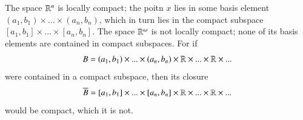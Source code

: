 \documentclass[12pt, a4paper, oneside, openright, titlepage]{book}
\begin{document}
\begin{eg}
    The space $\mathbb R^n$ is locally compact; the poitn $x$ lies in some basis element $(a_1,b_1)\times ... \times (a_n,b_n)$, which in turn lies in the compact subspace $[a_1,b_1]\times ... \times [a_n,b_n]$. The space $\mathbb R^{\omega}$ is not locally compact; none of its basis elements are contained in compact subspaces. For if \begin{equation*}
        B = (a_1,b_1)\times ... \times (a_n,b_n)\times \mathbb R\times ... \times \mathbb R\times ...
    \end{equation*}
    were contained in a compact subspace, then its closure \begin{equation*}
        \overline{B} = [a_1,b_1]\times ... \times [a_n,b_n]\times \mathbb R\times ... \times \mathbb R\times ...
    \end{equation*}
    would be compact, which it is not.
\end{eg}
\end{document}
